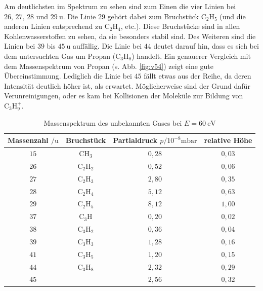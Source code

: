 Am deutlichsten im Spektrum zu sehen sind zum Einen die vier Linien bei $26, \, 27, \, 28$ und $\SI{29}{\amu}$. Die Linie $29$ gehört dabei zum Bruchstück $\textrm{C}_{2}\textrm{H}_{5}$ (und die anderen Linien entsprechend zu $\textrm{C}_{2}\textrm{H}_{4}$, etc.).
Diese Bruchstücke sind in allen Kohlenwasserstoffen zu sehen, da sie besonders stabil sind. Des Weiteren sind die Linien bei $39$ bis $\SI{45}{\amu}$ auffällig. Die Linie bei $44$ deutet darauf hin, dass es sich bei dem untersuchten Gas um Propan ($\textrm{C}_{3}\textrm{H}_{8}$) handelt.
Ein genauerer Vergleich mit dem Massenspektrum von Propan (s. Abb. \ref{fig:v54}) zeigt eine gute Übereinstimmung. Lediglich die Linie bei $45$ fällt etwas aus der Reihe, da deren Intensität deutlich höher ist, als erwartet.
Möglicherweise sind der Grund dafür Verunreinigungen, oder es kam bei Kollisionen der Moleküle zur Bildung von $\textrm{C}_{3}\textrm{H}_{9}^{+}$.

\begin{table}[tb]
 \centering
 \caption{Massenspektrum des unbekannten Gases bei $E=\SI{60}{\electronvolt}$}
 \label{tab:v5}
 \begin{tabular}{cccc} \toprule
   Massenzahl $/\si{\amu}$ & Bruchstück & Partialdruck $p/10^{-8}\si{\milli \bar}$ & relative Höhe \\ \midrule
   $15$ & CH$_{3}$ & $0,28$ & $0,03$\\
   $26$ & C$_{2}$H$_{2}$ & $0,52$ & $0,06$ \\
   $27$ & C$_{2}$H$_{3}$ & $2,80$ & $0,35$ \\
   $28$ & C$_{2}$H$_{4}$ & $5,12$ & $0,63$ \\
   $29$ & C$_{2}$H$_{5}$ & $8,12$ & $1,00$ \\
   $37$ & C$_{3}$H & $0,20$ & $0,02$ \\
   $38$ & C$_{3}$H$_{2}$ & $0,36$ & $0,04$ \\
   $39$ & C$_{3}$H$_{3}$ & $1,28$ & $0,16$ \\
   $41$ & C$_{3}$H$_{5}$ & $1,20$ & $0,15$ \\
   $44$ & C$_{3}$H$_{8}$ & $2,32$ & $0,29$ \\
   $45$ & & $2,56$ & $0,32$ \\ \bottomrule
 \end{tabular}
\end{table}


